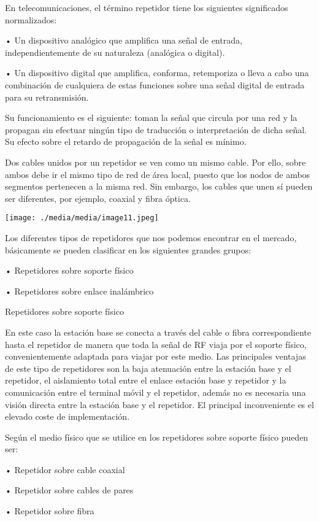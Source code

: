 En telecomunicaciones, el término repetidor tiene los siguientes
significados normalizados:

• Un dispositivo analógico que amplifica una señal de entrada,
independientemente de su naturaleza (analógica o digital).

• Un dispositivo digital que amplifica, conforma, retemporiza o lleva a
cabo una combinación de cualquiera de estas funciones sobre una señal
digital de entrada para su retransmisión.

Su funcionamiento es el siguiente: toman la señal que circula por una
red y la propagan sin efectuar ningún tipo de traducción o
interpretación de dicha señal. Su efecto sobre el retardo de propagación
de la señal es mínimo.

Dos cables unidos por un repetidor se ven como un mismo cable. Por ello,
sobre ambos debe ir el mismo tipo de red de área local, puesto que los
nodos de ambos segmentos pertenecen a la misma red. Sin embargo, los
cables que unen sí pueden ser diferentes, por ejemplo, coaxial y fibra
óptica.

\texttt{[image: ./media/media/image11.jpeg]}

Los diferentes tipos de repetidores que nos podemos encontrar en el
mercado, básicamente se pueden clasificar en los siguientes grandes
grupos:

• Repetidores sobre soporte físico

• Repetidores sobre enlace inalámbrico

Repetidores sobre soporte físico

En este caso la estación base se conecta a través del cable o fibra
correspondiente hasta el repetidor de manera que toda la señal de RF
viaja por el soporte físico, convenientemente adaptada para viajar por
este medio. Las principales ventajas de este tipo de repetidores son la
baja atenuación entre la estación base y el repetidor, el aislamiento
total entre el enlace estación base y repetidor y la comunicación entre
el terminal móvil y el repetidor, además no es necesaria una visión
directa entre la estación base y el repetidor. El principal
inconveniente es el elevado coste de implementación.

Según el medio físico que se utilice en los repetidores sobre soporte
físico pueden ser:

• Repetidor sobre cable coaxial

• Repetidor sobre cables de pares

• Repetidor sobre fibra

